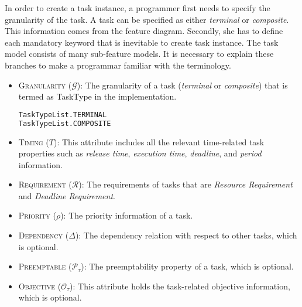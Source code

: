 \documentclass[]{scrartcl}
\begin{document}
In order to create a task instance, a programmer first needs to specify the granularity of the task. A task can be specified as either \emph{terminal} or \emph{composite}. This information comes from the feature diagram.
Secondly, she has to define each mandatory keyword that is inevitable to create task instance. The task model consists of many sub-feature models. It is necessary to explain these branches to make a programmar familiar with
the terminology.
\begin{itemize}
    \item \textsc{Granularity} ($\mathcal{G}$): The granularity of a task (\emph{terminal} or \emph{composite}) that is termed as \textsf{TaskType} in the implementation.

\begin{lstlisting}[language=Python, frame=single, label={lst:TaskTypeListt1}, caption={The enumeration of the type of tasks.}]
TaskTypeList.TERMINAL
TaskTypeList.COMPOSITE
\end{lstlisting}
        
    \item \textsc{Timing} ($T$): This attribute includes all the relevant time-related task properties such as \emph{release time}, \emph{execution time}, \emph{deadline}, and \emph{period} information.
    \item \textsc{Requirement} ($\mathcal{R}$): The requirements of tasks that are \emph{Resource Requirement} and \emph{Deadline Requirement}.
    \item \textsc{Priority} ($\rho$): The priority information of a task.
    \item \textsc{Dependency} ($\Delta$): The dependency relation with respect to other tasks, which is optional.
    \item \textsc{Preemptable} ($\mathcal{P}_\tau$): The preemptability property of a task, which is optional.
    \item \textsc{Objective} ($\mathcal{O}_{\tau}$): This attribute holds the task-related objective information, which is optional.
\end{itemize}
\end{document}
